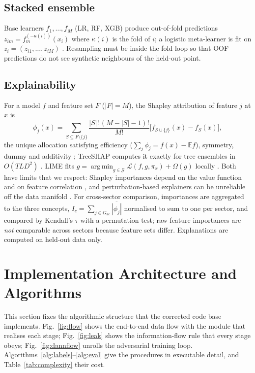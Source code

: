 \documentclass[journal]{IEEEtran}
\newcommand{\E}{\mathbb{E}}
\newcommand{\1}{\mathbf{1}}
\DeclareMathOperator*{\argmin}{arg\,min}
\begin{document}
\subsection{Stacked ensemble}
Base learners $f_1,\dots,f_M$ (LR, RF, XGB) produce out-of-fold predictions $z_{im}=f_m^{(-\kappa(i))}(x_i)$ where $\kappa(i)$ is the fold of $i$; a logistic meta-learner is fit on $z_i=(z_{i1},\dots,z_{iM})$ \cite{wolpert1992stacked}. Resampling must be inside the fold loop so that OOF predictions do not see synthetic neighbours of the held-out point.

\subsection{Explainability}\label{sec:xai}
For a model $f$ and feature set $F$ ($|F|=M$), the Shapley attribution of feature $j$ at $x$ is
\begin{equation}
\phi_j(x)=\sum_{S\subseteq F\setminus\{j\}}\frac{|S|!\,(M-|S|-1)!}{M!}\big[f_{S\cup\{j\}}(x)-f_S(x)\big],
\end{equation}
the unique allocation satisfying efficiency ($\sum_j\phi_j=f(x)-\E f$), symmetry, dummy and additivity \cite{lundberg2017shap}; TreeSHAP computes it exactly for tree ensembles in $O(TLD^2)$ \cite{lundberg2020trees}. LIME fits $g=\argmin_{g\in\mathcal G}\mathcal L(f,g,\pi_x)+\Omega(g)$ locally \cite{ribeiro2016lime}. Both have limits that we respect: Shapley importances depend on the value function and on feature correlation \cite{kumar2020shapley}, and perturbation-based explainers can be unreliable off the data manifold \cite{slack2020fooling}. For cross-sector comparison, importances are aggregated to the three concepts, $I_c=\sum_{j\in G_{kc}}\overline{|\phi_j|}$ normalised to sum to one per sector, and compared by Kendall's $\tau$ with a permutation test; raw feature importances are \emph{not} comparable across sectors because feature sets differ. Explanations are computed on held-out data only.

\section{Implementation Architecture and Algorithms}\label{sec:impl}
This section fixes the algorithmic structure that the corrected code base implements. Fig.~\ref{fig:flow} shows the end-to-end data flow with the module that realises each stage; Fig.~\ref{fig:leak} shows the information-flow rule that every stage obeys; Fig.~\ref{fig:dannflow} unrolls the adversarial training loop. Algorithms~\ref{alg:labels}--\ref{alg:eval} give the procedures in executable detail, and Table~\ref{tab:complexity} their cost.
\end{document}
